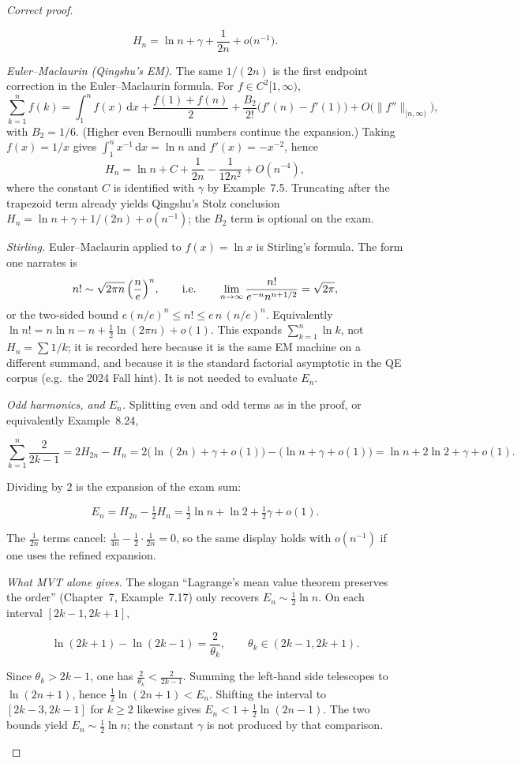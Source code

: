 \documentclass[11pt,a4paper]{article}
\begin{document}
\begin{proof}[Correct proof]
\begin{remark}
\[
H_{n}
=
\ln n+\gamma+\frac{1}{2n}+o\bigl(n^{-1}\bigr).
\]

\emph{Euler--Maclaurin (Qingshu's EM).} The same \(1/(2n)\) is the first endpoint correction in the Euler--Maclaurin formula. For \(f\in C^{2}[1,\infty)\),
\[
\sum_{k=1}^{n}f(k)
=
\int_{1}^{n}f(x)\,\mathrm{d}x
+
\frac{f(1)+f(n)}{2}
+
\frac{B_{2}}{2!}\bigl(f'(n)-f'(1)\bigr)
+
O\bigl(\|f''\|_{[n,\infty)}\bigr),
\]
with \(B_{2}=1/6\). (Higher even Bernoulli numbers continue the expansion.) Taking \(f(x)=1/x\) gives \(\int_{1}^{n}x^{-1}\,\mathrm{d}x=\ln n\) and \(f'(x)=-x^{-2}\), hence
\[
H_{n}
=
\ln n
+
C
+
\frac{1}{2n}
-
\frac{1}{12n^{2}}
+
O(n^{-4}),
\]
where the constant \(C\) is identified with \(\gamma\) by Example~7.5. Truncating after the trapezoid term already yields Qingshu's Stolz conclusion \(H_{n}=\ln n+\gamma+1/(2n)+o(n^{-1})\); the \(B_{2}\) term is optional on the exam.

\emph{Stirling.} Euler--Maclaurin applied to \(f(x)=\ln x\) is Stirling's formula. The form one narrates is
\[
n!
\sim
\sqrt{2\pi n}\,\Bigl(\frac{n}{e}\Bigr)^{n},
\qquad\text{i.e.}\qquad
\lim_{n\to\infty}
\frac{n!}{e^{-n}n^{n+1/2}}
=
\sqrt{2\pi},
\]
or the two-sided bound \(e(n/e)^{n}\le n!\le e\,n\,(n/e)^{n}\). Equivalently \(\ln n!=n\ln n-n+\tfrac12\ln(2\pi n)+o(1)\). This expands \(\sum_{k=1}^{n}\ln k\), not \(H_{n}=\sum 1/k\); it is recorded here because it is the same EM machine on a different summand, and because it is the standard factorial asymptotic in the QE corpus (e.g.\ the 2024 Fall hint). It is not needed to evaluate \(E_{n}\).

\emph{Odd harmonics, and \(E_{n}\).} Splitting even and odd terms as in the proof, or equivalently Example~8.24,

\[
\sum_{k=1}^{n}\frac{2}{2k-1}
=
2H_{2n}-H_{n}
=
2\bigl(\ln(2n)+\gamma+o(1)\bigr)-\bigl(\ln n+\gamma+o(1)\bigr)
=
\ln n+2\ln 2+\gamma+o(1).
\]

Dividing by \(2\) is the expansion of the exam sum:

\[
E_{n}
=
H_{2n}-\tfrac12 H_{n}
=
\tfrac12\ln n+\ln 2+\tfrac12\gamma+o(1).
\]

The \(\frac{1}{2n}\) terms cancel: \(\frac{1}{4n}-\frac12\cdot\frac{1}{2n}=0\), so the same display holds with \(o(n^{-1})\) if one uses the refined expansion.

\emph{What MVT alone gives.} The slogan ``Lagrange's mean value theorem preserves the order'' (Chapter~7, Example~7.17) only recovers \(E_{n}\sim\tfrac12\ln n\). On each interval \([2k-1,2k+1]\),

\[
\ln(2k+1)-\ln(2k-1)=\frac{2}{\theta_{k}},
\qquad
\theta_{k}\in(2k-1,2k+1).
\]

Since \(\theta_{k}>2k-1\), one has \(\frac{2}{\theta_{k}}<\frac{2}{2k-1}\). Summing the left-hand side telescopes to \(\ln(2n+1)\), hence \(\frac12\ln(2n+1)<E_{n}\). Shifting the interval to \([2k-3,2k-1]\) for \(k\ge 2\) likewise gives \(E_{n}<1+\frac12\ln(2n-1)\). The two bounds yield \(E_{n}\sim\tfrac12\ln n\); the constant \(\gamma\) is not produced by that comparison.
\end{remark}
\end{proof}
\end{document}
